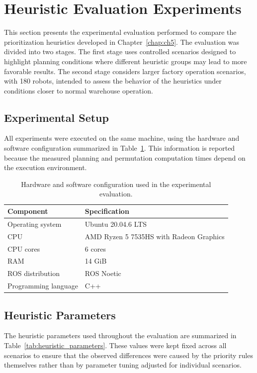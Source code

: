 \section{Heuristic Evaluation Experiments}
\label{sec:heuristic_evaluation_experiments}
\hspace{\parindent}
This section presents the experimental evaluation performed to compare the prioritization heuristics
developed in Chapter~\ref{chap:ch5}. The evaluation was divided into two stages. The first stage
uses controlled scenarios designed to highlight planning conditions where different heuristic groups
may lead to more favorable results. The second stage considers larger factory operation scenarios,
with 180 robots, intended to assess the behavior of the heuristics under conditions closer to normal
warehouse operation.

\subsection{Experimental Setup}
\label{subsec:heuristic_experimental_setup}
\hspace{\parindent}
All experiments were executed on the same machine, using the hardware and software configuration
summarized in Table~\ref{tab:experimental_setup}. This information is reported because the
measured planning and permutation computation times depend on the execution environment.

\begin{table}[H]
\centering
\caption{Hardware and software configuration used in the experimental evaluation.}
\label{tab:experimental_setup}
\footnotesize
\setlength{\tabcolsep}{6pt}
\begin{tabular}{@{}ll@{}}
\toprule
\textbf{Component} & \textbf{Specification} \\
\midrule
Operating system & Ubuntu 20.04.6 LTS \\
CPU & AMD Ryzen 5 7535HS with Radeon Graphics \\
CPU cores & 6 cores \\
RAM & 14 GiB \\
ROS distribution & ROS Noetic \\
Programming language & C++ \\
\bottomrule
\end{tabular}
\end{table}

\subsection{Heuristic Parameters}
\label{subsec:heuristic_parameters}
\hspace{\parindent}
The heuristic parameters used throughout the evaluation are summarized in
Table~\ref{tab:heuristic_parameters}. These values were kept fixed across all scenarios to ensure
that the observed differences were caused by the priority rules themselves rather than by
parameter tuning adjusted for individual scenarios.

